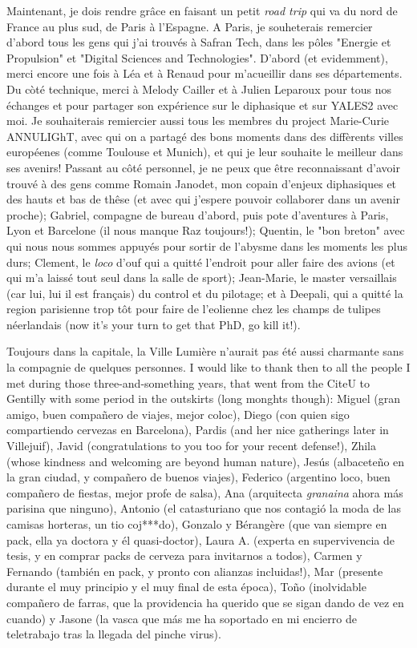 Maintenant, je dois rendre grâce en faisant un petit \textsl{road trip} qui va du nord de France au plus sud, de Paris à l'Espagne. A Paris, je souheterais remercier d'abord tous les gens qui j'ai trouvés à Safran Tech, dans les pôles "Energie et Propulsion" et "Digital Sciences and Technologies". D'abord (et evidemment), merci encore une fois à Léa et à Renaud pour m'acueillir dans ses départements. Du còté technique, merci à Melody Cailler et à Julien Leparoux pour tous nos échanges et pour partager son expérience sur le diphasique et sur YALES2 avec moi. Je souhaiterais remiercier aussi tous les membres du project Marie-Curie ANNULIGhT, avec qui on a partagé des bons moments dans des diffèrents villes européenes (comme Toulouse et Munich), et qui je leur souhaite le meilleur dans ses avenirs! Passant au côté personnel, je ne peux que être reconnaissant d'avoir trouvé à des gens comme Romain Janodet, mon copain d'enjeux diphasiques et des hauts et bas de thêse (et avec qui j'espere pouvoir collaborer dans un avenir proche); Gabriel, compagne de bureau d'abord, puis pote d'aventures à Paris, Lyon et Barcelone (il nous manque Raz toujours!); Quentin, le "bon breton" avec qui nous nous sommes appuyés pour sortir de l'abysme dans les moments les plus durs; Clement, le \textsl{loco} d'ouf qui a quitté l'endroit pour aller faire des avions (et qui m'a laissé tout seul dans la salle de sport); Jean-Marie, le master versaillais (car lui, lui il est français) du control et du pilotage; et à Deepali, qui a quitté la region parisienne trop tôt pour faire de l'eolienne chez les champs de tulipes néerlandais (now it's your turn to get that PhD, go kill it!).
  
Toujours dans la capitale, la Ville Lumière n'aurait pas été aussi charmante sans la compagnie de quelques personnes. I would like to thank then to all the people I met during those three-and-something years, that went from the CiteU to Gentilly with some period in the outskirts (long monghts though): Miguel (gran amigo, buen compañero de viajes, mejor coloc), Diego (con quien sigo compartiendo cervezas en Barcelona), Pardis (and her nice gatherings later in Villejuif), Javid (congratulations to you too for your recent defense!), Zhila (whose kindness and welcoming are beyond human nature), Jesús (albaceteño en la gran ciudad, y compañero de buenos viajes), Federico (argentino loco, buen compañero de fiestas, mejor profe de salsa), Ana (arquitecta \textsl{granaina} ahora más parisina que ninguno), Antonio (el catasturiano que nos contagió la moda de las camisas horteras, un tio coj***do), Gonzalo y Bérangère (que van siempre en pack, ella ya doctora y él quasi-doctor), Laura A. (experta en supervivencia de tesis, y en comprar packs de cerveza para invitarnos a todos), Carmen y Fernando (también en pack, y pronto con alianzas incluidas!), Mar (presente durante el muy principio y el muy final de esta época), Toño (inolvidable compañero de farras, que la providencia ha querido que se sigan dando de vez en cuando) y Jasone (la vasca que más me ha soportado en mi encierro de teletrabajo tras la llegada del pinche virus).

